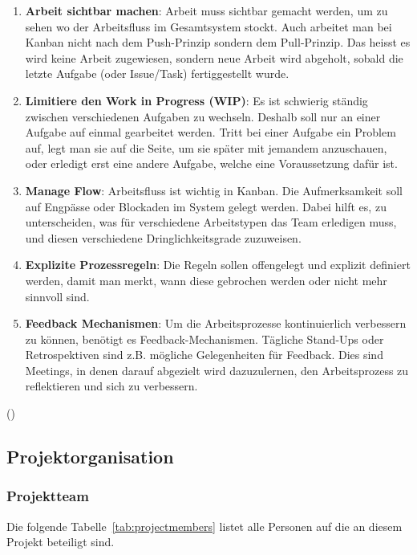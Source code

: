 \begin{enumerate}
    \item \textbf{Arbeit sichtbar machen}: Arbeit muss sichtbar gemacht werden, um zu sehen wo der Arbeitsfluss im Gesamtsystem stockt.
        Auch arbeitet man bei Kanban nicht nach dem Push-Prinzip sondern dem Pull-Prinzip.
        Das heisst es wird keine Arbeit zugewiesen, sondern neue Arbeit wird abgeholt, sobald die letzte Aufgabe (oder Issue/Task) fertiggestellt wurde.
    \item \textbf{Limitiere den Work in Progress (WIP)}: Es ist schwierig ständig zwischen verschiedenen Aufgaben zu wechseln. Deshalb soll nur an einer Aufgabe auf einmal gearbeitet werden.
    Tritt bei einer Aufgabe ein Problem auf, legt man sie auf die Seite, um sie später mit jemandem anzuschauen, oder erledigt erst eine andere Aufgabe, welche eine Voraussetzung dafür ist.
    \item \textbf{Manage Flow}: Arbeitsfluss ist wichtig in Kanban.
    Die Aufmerksamkeit soll auf Engpässe oder Blockaden im System gelegt werden.
    Dabei hilft es, zu unterscheiden, was für verschiedene Arbeitstypen das Team erledigen muss, und diesen verschiedene Dringlichkeitsgrade zuzuweisen.
    \item \textbf{Explizite Prozessregeln}: Die Regeln sollen offengelegt und explizit definiert werden, damit man merkt, wann diese gebrochen werden oder nicht mehr sinnvoll sind.
    \item \textbf{Feedback Mechanismen}: Um die Arbeitsprozesse kontinuierlich verbessern zu können, benötigt es Feedback-Mechanismen. Tägliche Stand-Ups oder Retrospektiven sind z.B. mögliche Gelegenheiten für Feedback. Dies sind Meetings, in denen darauf abgezielt wird dazuzulernen, den Arbeitsprozess zu reflektieren und sich zu verbessern.
\end{enumerate}

(\cite[p.~17-22]{siegfried_kaltenecker_kanban_2013})

\subsection{Projektorganisation}

\subsubsection{Projektteam}

Die folgende Tabelle~\ref{tab:projectmembers} listet alle Personen auf die an diesem Projekt beteiligt sind.

